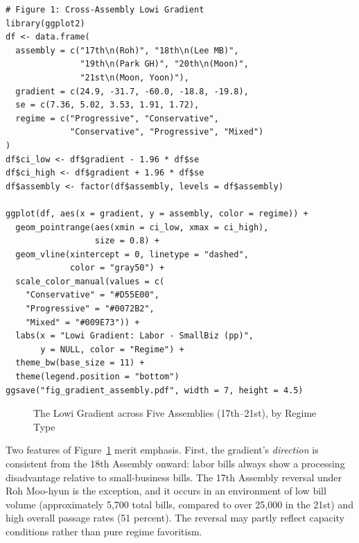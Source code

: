 \documentclass[11pt]{article}
\begin{document}
\begin{verbatim}
# Figure 1: Cross-Assembly Lowi Gradient
library(ggplot2)
df <- data.frame(
  assembly = c("17th\n(Roh)", "18th\n(Lee MB)",
               "19th\n(Park GH)", "20th\n(Moon)",
               "21st\n(Moon, Yoon)"),
  gradient = c(24.9, -31.7, -60.0, -18.8, -19.8),
  se = c(7.36, 5.02, 3.53, 1.91, 1.72),
  regime = c("Progressive", "Conservative",
             "Conservative", "Progressive", "Mixed")
)
df$ci_low <- df$gradient - 1.96 * df$se
df$ci_high <- df$gradient + 1.96 * df$se
df$assembly <- factor(df$assembly, levels = df$assembly)

ggplot(df, aes(x = gradient, y = assembly, color = regime)) +
  geom_pointrange(aes(xmin = ci_low, xmax = ci_high),
                  size = 0.8) +
  geom_vline(xintercept = 0, linetype = "dashed",
             color = "gray50") +
  scale_color_manual(values = c(
    "Conservative" = "#D55E00",
    "Progressive" = "#0072B2",
    "Mixed" = "#009E73")) +
  labs(x = "Lowi Gradient: Labor - SmallBiz (pp)",
       y = NULL, color = "Regime") +
  theme_bw(base_size = 11) +
  theme(legend.position = "bottom")
ggsave("fig_gradient_assembly.pdf", width = 7, height = 4.5)
\end{verbatim}

\begin{figure}[H]
\centering
{}
\caption{The Lowi Gradient across Five Assemblies (17th--21st), by Regime Type}
\label{fig:gradient}
\end{figure}

Two features of Figure~\ref{fig:gradient} merit emphasis. First, the gradient's \emph{direction} is consistent from the 18th Assembly onward: labor bills always show a processing disadvantage relative to small-business bills. The 17th Assembly reversal under Roh Moo-hyun is the exception, and it occurs in an environment of low bill volume (approximately 5,700 total bills, compared to over 25,000 in the 21st) and high overall passage rates (51 percent). The reversal may partly reflect capacity conditions rather than pure regime favoritism.
\end{document}
